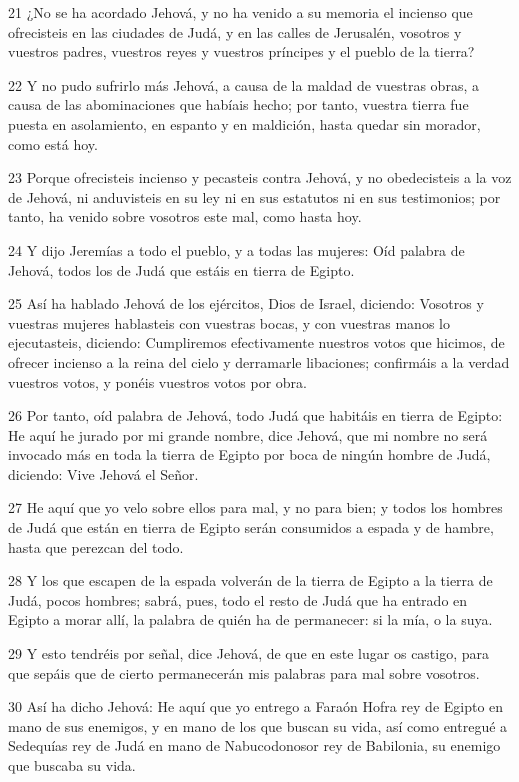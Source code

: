 \par 21 ¿No se ha acordado Jehová, y no ha venido a su memoria el incienso que ofrecisteis en las ciudades de Judá, y en las calles de Jerusalén, vosotros y vuestros padres, vuestros reyes y vuestros príncipes y el pueblo de la tierra?
\par 22 Y no pudo sufrirlo más Jehová, a causa de la maldad de vuestras obras, a causa de las abominaciones que habíais hecho; por tanto, vuestra tierra fue puesta en asolamiento, en espanto y en maldición, hasta quedar sin morador, como está hoy.
\par 23 Porque ofrecisteis incienso y pecasteis contra Jehová, y no obedecisteis a la voz de Jehová, ni anduvisteis en su ley ni en sus estatutos ni en sus testimonios; por tanto, ha venido sobre vosotros este mal, como hasta hoy.
\par 24 Y dijo Jeremías a todo el pueblo, y a todas las mujeres: Oíd palabra de Jehová, todos los de Judá que estáis en tierra de Egipto.
\par 25 Así ha hablado Jehová de los ejércitos, Dios de Israel, diciendo: Vosotros y vuestras mujeres hablasteis con vuestras bocas, y con vuestras manos lo ejecutasteis, diciendo: Cumpliremos efectivamente nuestros votos que hicimos, de ofrecer incienso a la reina del cielo y derramarle libaciones; confirmáis a la verdad vuestros votos, y ponéis vuestros votos por obra.
\par 26 Por tanto, oíd palabra de Jehová, todo Judá que habitáis en tierra de Egipto: He aquí he jurado por mi grande nombre, dice Jehová, que mi nombre no será invocado más en toda la tierra de Egipto por boca de ningún hombre de Judá, diciendo: Vive Jehová el Señor.
\par 27 He aquí que yo velo sobre ellos para mal, y no para bien; y todos los hombres de Judá que están en tierra de Egipto serán consumidos a espada y de hambre, hasta que perezcan del todo.
\par 28 Y los que escapen de la espada volverán de la tierra de Egipto a la tierra de Judá, pocos hombres; sabrá, pues, todo el resto de Judá que ha entrado en Egipto a morar allí, la palabra de quién ha de permanecer: si la mía, o la suya.
\par 29 Y esto tendréis por señal, dice Jehová, de que en este lugar os castigo, para que sepáis que de cierto permanecerán mis palabras para mal sobre vosotros.
\par 30 Así ha dicho Jehová: He aquí que yo entrego a Faraón Hofra rey de Egipto en mano de sus enemigos, y en mano de los que buscan su vida, así como entregué a Sedequías rey de Judá en mano de Nabucodonosor rey de Babilonia, su enemigo que buscaba su vida.

